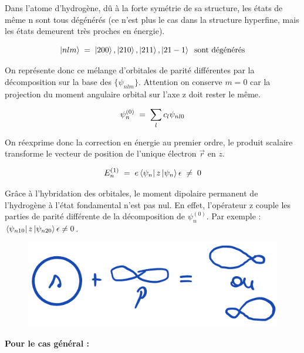 Dans l'atome d'hydrogène, dû à la forte symétrie de sa structure, les états de même n sont tous dégénérés (ce n'est plus le cas dans la structure hyperfine, mais les états demeurent très proches en énergie).

\begin{equation*}
    \ket{nlm}\; = \; \ket{200},\ket{210},\ket{211},\ket{21-1}\;\;\text{sont dégénérés}
\end{equation*}

On représente donc ce mélange d'orbitales de parité différentes par la décomposition sur la base des $\{\psi_{nlm}\}$. Attention on conserve $m = 0$ car la projection du moment angulaire orbital sur l'axe z doit rester le même. %

\begin{equation*}
    \psi_n^{(0)} \; = \; \sum_l c_l \psi_{nl0}
\end{equation*}

On réexprime donc la correction en énergie au premier ordre, le produit scalaire transforme le vecteur de position de l'unique électron $\vec{r}$ en $z$.

\begin{equation*}
    E_n^{(1)} \; = \; e\bra{\psi_n}z\ket{\psi_n}\epsilon \;\neq \; 0
\end{equation*}

Grâce à l'hybridation des orbitales, le moment dipolaire permanent de l'hydrogène à l'état fondamental n'est pas nul. En effet, l'opérateur z couple les parties de parité différente de la décomposition de $\psi_n^{(0)}$. Par exemple : $\bra{\psi_{n10}}z\ket{\psi_{n20}}\epsilon \neq 0$.\\

\begin{figure}[tph]
    \centering
    \includegraphics[scale=0.5]{Images2/hybridation.png}
\end{figure}

\textbf{Pour le cas général :}\\


